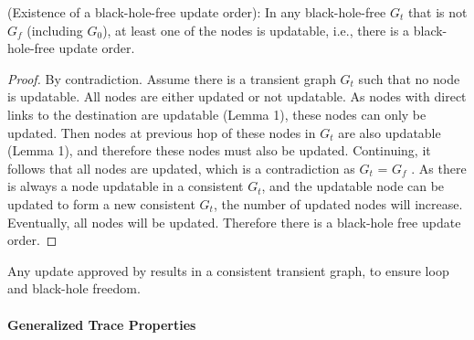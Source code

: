   \vspace{-0.1in}
\begin{theorem} (Existence of a black-hole-free update order): 
In any black-hole-free $G_t$ that is not $G_f$ 
(including $G_0$), at least one of the nodes is updatable, i.e., there is a black-hole-free update order.
\end{theorem}
  \vspace{-0.1in}

  \vspace{-0.1in}
\begin{proof} By contradiction. 
Assume there is a transient graph $G_t$ such that
no node is updatable.  All nodes are either
updated or not updatable. As nodes with direct links to the destination are
updatable (Lemma 1), these nodes can only
be updated. Then nodes at previous hop of these nodes in $G_t$ are also updatable (Lemma 1), 
and therefore these nodes must also be updated. Continuing,
 it follows that all nodes are updated, which is a
contradiction as $G_t$ = $G_f$ . As there is always a node updatable
in a consistent $G_t$, and the updatable node can be
updated to form a new consistent $G_t$, 
the number of updated nodes will increase.
Eventually, all nodes will be updated. Therefore there is a black-hole free
update order.
\end{proof}
  \vspace{-0.1in}
%
Any update approved by \name
results in a consistent transient graph,
to ensure loop and black-hole freedom.

\paragraph{Generalized Trace Properties}

